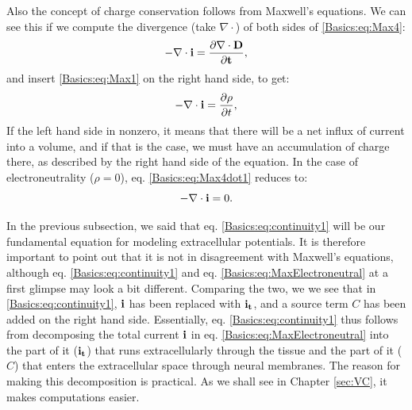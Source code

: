Also the concept of charge conservation follows from Maxwell's equations. We can see this if we 
compute the divergence (take $\nabla \cdot$) of both sides of \ref{Basics:eq:Max4}:
\begin{equation}
- \nabla \cdot \bf{i} =  \frac{\partial {\bf \nabla \cdot D}}{\partial t}, 
\label{Basics:eq:Max4dot}
\end{equation}
and insert \ref{Basics:eq:Max1} on the right hand side, to get:
\begin{equation}
- \nabla \cdot {\bf i} =  \frac{\partial \rho}{\partial t},
\label{Basics:eq:Max4dot1}
\end{equation}
If the left hand side in nonzero, it means that there will be a net influx of current into a volume, and if that is the case, we must have an accumulation of charge there, as described by the right hand side of the equation. In the case of electroneutrality ($\rho = 0$), eq. \ref{Basics:eq:Max4dot1} reduces to:
\begin{equation}
- \nabla \cdot {\bf i} =  0.
\label{Basics:eq:MaxElectroneutral}
\end{equation}

In the previous subsection, we said that eq. \ref{Basics:eq:continuity1} will be our fundamental equation for modeling extracellular potentials. It is therefore important to point out that it is not in disagreement with Maxwell's equations, although eq. \ref{Basics:eq:continuity1} and eq. \ref{Basics:eq:MaxElectroneutral} at a first glimpse may look a bit different. Comparing the two, we we see that in \ref{Basics:eq:continuity1}, ${\bf i}$ has been replaced with ${\bf i_t}$, and a source term $C$ has been added on the right hand side. Essentially, eq. \ref{Basics:eq:continuity1} thus follows from decomposing the total current ${\bf i}$ in eq. \ref{Basics:eq:MaxElectroneutral} into the part of it ($\bf{i_t}$) that runs extracellularly through the tissue and the part of it ($C$) that enters the extracellular space through neural membranes. The reason for making this decomposition is practical. As we shall see in Chapter \ref{sec:VC}, it makes computations easier.

